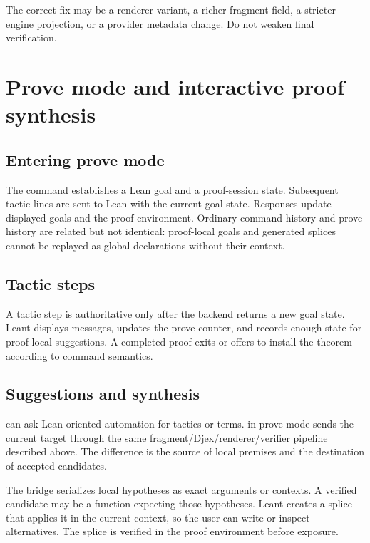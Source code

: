 \documentclass[10pt,letterpaper,oneside]{report}
\newcommand{\code}[1]{\texttt{\detokenize{#1}}}
\begin{document}
The correct fix may be a renderer variant, a richer fragment field, a stricter engine projection, or a provider metadata change. Do not weaken final verification.

\chapter{Prove mode and interactive proof synthesis}\label{ch:prove-mode}

\section{Entering prove mode}

The \code{:prove} command establishes a Lean goal and a proof-session state. Subsequent tactic lines are sent to Lean with the current goal state. Responses update displayed goals and the proof environment. Ordinary command history and prove history are related but not identical: proof-local goals and generated splices cannot be replayed as global declarations without their context.

\section{Tactic steps}

A tactic step is authoritative only after the backend returns a new goal state. Leant displays messages, updates the prove counter, and records enough state for proof-local suggestions. A completed proof exits or offers to install the theorem according to command semantics.

\section{Suggestions and synthesis}

\code{:suggest} can ask Lean-oriented automation for tactics or terms. \code{:synth} in prove mode sends the current target through the same fragment/Djex/renderer/verifier pipeline described above. The difference is the source of local premises and the destination of accepted candidates.

The bridge serializes local hypotheses as exact arguments or contexts. A verified candidate may be a function expecting those hypotheses. Leant creates a splice that applies it in the current context, so the user can write \code{exact it} or inspect alternatives. The splice is verified in the proof environment before exposure.
\end{document}
